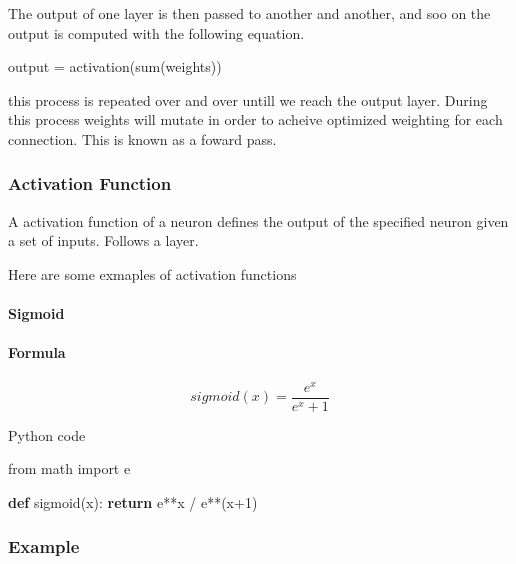 \documentclass[
]{article}
\newenvironment{Shaded}{}{}
\newcommand{\BuiltInTok}[1]{#1}
\newcommand{\ControlFlowTok}[1]{\textcolor[rgb]{0.00,0.44,0.13}{\textbf{#1}}}
\newcommand{\DecValTok}[1]{\textcolor[rgb]{0.25,0.63,0.44}{#1}}
\newcommand{\ImportTok}[1]{#1}
\newcommand{\KeywordTok}[1]{\textcolor[rgb]{0.00,0.44,0.13}{\textbf{#1}}}
\newcommand{\NormalTok}[1]{#1}
\newcommand{\OperatorTok}[1]{\textcolor[rgb]{0.40,0.40,0.40}{#1}}
\begin{document}
The output of one layer is then passed to another and another, and soo
on the output is computed with the following equation.

\begin{Shaded}
\begin{Highlighting}[]
\NormalTok{output }\OperatorTok{=}\NormalTok{ activation(}\BuiltInTok{sum}\NormalTok{(weights))}
\end{Highlighting}
\end{Shaded}

this process is repeated over and over untill we reach the output layer.
During this process weights will mutate in order to acheive optimized
weighting for each connection. This is known as a foward pass.

\hypertarget{activation-function}{%
\subsubsection{Activation Function}\label{activation-function}}

A activation function of a neuron defines the output of the specified
neuron given a set of inputs. Follows a layer.

Here are some exmaples of activation functions

\hypertarget{sigmoid}{%
\paragraph{Sigmoid}\label{sigmoid}}

\paragraph{Formula}

\[sigmoid(x) = \dfrac{e^x}{e^x+1}\]

Python code

\begin{Shaded}
\begin{Highlighting}[]
\ImportTok{from}\NormalTok{ math }\ImportTok{import}\NormalTok{ e}

\KeywordTok{def}\NormalTok{ sigmoid(x):}
    \ControlFlowTok{return}\NormalTok{ e}\OperatorTok{**}\NormalTok{x }\OperatorTok{/}\NormalTok{ e}\OperatorTok{**}\NormalTok{(x}\OperatorTok{+}\DecValTok{1}\NormalTok{) }
\end{Highlighting}
\end{Shaded}

\hypertarget{example}{%
\subsubsection{Example}\label{example}}
\end{document}
